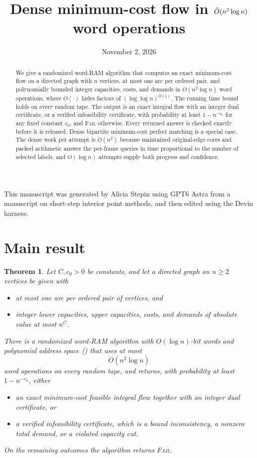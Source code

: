 \documentclass[11pt]{article}
\title{Dense minimum-cost flow in $\O(n^2\log n)$ word operations}
\date{November 2, 2026}
\newtheorem{theorem}{Theorem}[section]
\theoremstyle{remark}
\renewcommand{\O}{\ddot{O}}
\begin{document}
\maketitle

\begin{abstract}
We give a randomized word-RAM algorithm that computes an exact minimum-cost
flow on a directed graph with $n$ vertices, at most one arc per ordered pair,
and polynomially bounded integer capacities, costs, and demands in
$\O(n^2\log n)$ word operations, where $\O(\cdot)$ hides factors of
$(\log\log n)^{O(1)}$.
The running time bound holds on every random tape.
The output is an exact integral flow with an integer dual certificate, or a
verified infeasibility certificate, with probability at least $1-n^{-c_0}$ for
any fixed constant $c_0$, and \textsc{Fail} otherwise.
Every returned answer is checked exactly before it is released.
Dense bipartite minimum-cost perfect matching is a special case.
The dense work per attempt is $\O(n^2)$ because maintained original-edge cores
and packed arithmetic answer the per-frame queries in time proportional to
the number of selected labels, and $O(\log n)$ attempts supply both progress
and confidence.
\end{abstract}

\begin{center}
\small
This manuscript was generated by Alicia Stepin using GPT6 Astra from a
manuscript on short-step interior point methods, and then edited using the
Devin harness.
\end{center}


\section{Main result}
\label{sec:ram27-objective}

\begin{theorem}
\label{thm:ram27-main}
Let $C,c_0>0$ be constants, and let a directed graph on $n\ge2$ vertices be
given with
\begin{itemize}
\item at most one arc per ordered pair of vertices, and
\item integer lower capacities, upper capacities, costs, and demands of
absolute value at most $n^C$.
\end{itemize}
There is a randomized word-RAM algorithm with $O(\log n)$-bit words and
polynomial address space () that uses at most
\[
\O\left(n^2\log n\right)
\]
word operations on every random tape, and returns, with probability at least
$1-n^{-c_0}$, either
\begin{itemize}
\item an exact minimum-cost feasible integral flow together with an integer
dual certificate, or
\item a verified infeasibility certificate, which is a bound inconsistency, a
nonzero total demand, or a violated capacity cut.
\end{itemize}
On the remaining outcomes the algorithm returns \textsc{Fail}.
\end{theorem}
\end{document}
